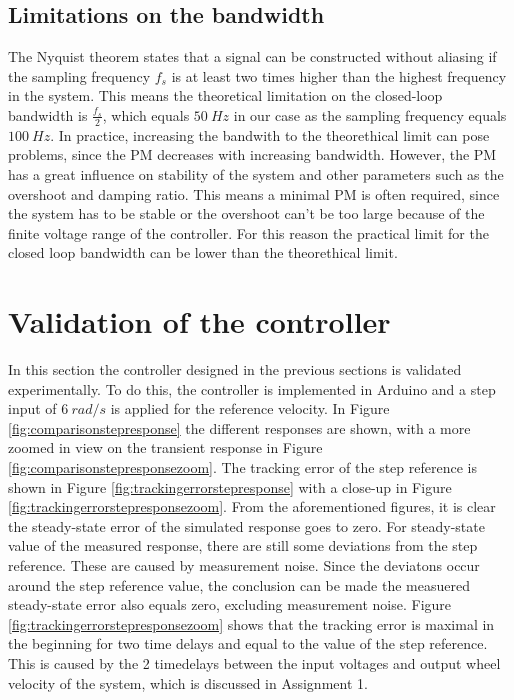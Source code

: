 \documentclass[a4paper,kul]{kulakarticle} %
\begin{document}
\subsection{Limitations on the bandwidth}
The Nyquist theorem states that a signal can be constructed without aliasing if the sampling frequency $f_s$ is at least two times higher than the highest frequency in the system. This means the theoretical limitation on the closed-loop bandwidth is $\frac{f_s}{2}$, which equals $\SI{50}{Hz}$ in our case as the sampling frequency equals $\SI{100}{Hz}$. In practice, increasing the bandwith to the theorethical limit can pose problems, since the PM decreases with increasing bandwidth. However, the PM has a great influence on stability of the system and other parameters such as the overshoot and damping ratio. This means a minimal PM is often required, since the system has to be stable or the overshoot can't be too large because of the finite voltage range of the controller. For this reason the practical limit for the closed loop bandwidth can be lower than the theorethical limit. 

\section{Validation of the controller}
In this section the controller designed in the previous sections is validated experimentally. To do this, the controller is implemented in Arduino and a step input of $\SI{6}{rad/s}$ is applied for the reference velocity. In Figure \ref{fig:comparisonstepresponse} the different responses are shown, with a more zoomed in view on the transient response in Figure \ref{fig:comparisonstepresponsezoom}. The tracking error of the step reference is shown in Figure \ref{fig:trackingerrorstepresponse} with a close-up in Figure \ref{fig:trackingerrorstepresponsezoom}. From the aforementioned figures, it is clear the steady-state error of the simulated response goes to zero. For steady-state value of the measured response, there are still some deviations from the step reference. These are caused by measurement noise. Since the deviatons occur around the step reference value, the conclusion can be made the measuered steady-state error also equals zero, excluding measurement noise. Figure \ref{fig:trackingerrorstepresponsezoom} shows that the tracking error is maximal in the beginning for two time delays and equal to the value of the step reference. This is caused by the 2 timedelays between the input voltages and output wheel velocity of the system, which is discussed in Assignment 1. 
\end{document}
